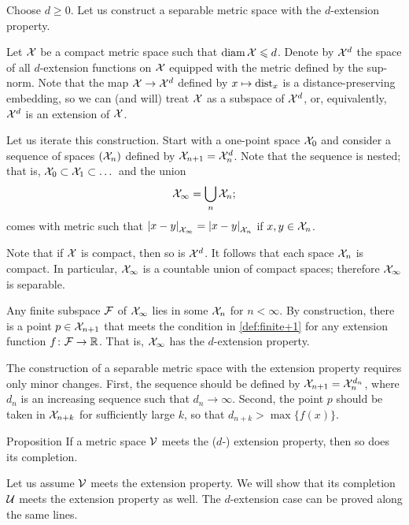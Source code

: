 Choose $d\ge 0$.
Let us construct a separable metric space with  the $d$-extension property.

Let $\mathcal{X}$ be a compact metric space such that $\operatorname{\rm diam}\nolimits\mathcal{X}\leqslant d$.
Denote by $\mathcal{X}^d$ the space of all $d$-extension functions on $\mathcal{X}$ equipped with the metric defined by the sup-norm.
Note that the map $\mathcal{X} \to \mathcal{X}^d$ defined by $x\mapsto\mathrm{dist}_x$ is a distance-preserving embedding,
so we can (and will) treat $\mathcal{X}$ as a subspace of $\mathcal{X}^d$, or, equivalently, $\mathcal{X}^d$ is an extension of $\mathcal{X}$.

Let us iterate this construction.
Start with a one-point space $\mathcal{X}_0$ and consider a sequence of spaces $(\mathcal{X}_n)$ defined by $\spc{X}_{n+1}\z=\spc{X}_n^d$.
Note that the sequence is nested;
that is, $\mathcal{X}_0\subset \mathcal{X}_1\subset\dots$
and the union
\[\mathcal{X}_\infty=\bigcup_n\mathcal{X}_n;\]
comes with metric such that
$\dist{x}{y}{\spc{X}_\infty} = \dist{x}{y}{\spc{X}_n}$
if $x,y\in\mathcal{X}_n$.

Note that if $\mathcal{X}$ is compact, then so is $\mathcal{X}^d$.
It follows that each space $\mathcal{X}_n$ is compact.
In particular, $\mathcal{X}_\infty$ is a countable union of compact spaces;
therefore $\mathcal{X}_\infty$ is separable.

Any finite subspace $\mathcal{F}$ of $\mathcal{X}_\infty$ lies in some $\mathcal{X}_n$ for $n<\infty$.
By construction, there is a point $p\in \mathcal{X}_{n+1}$ that meets the condition in \ref{def:finite+1} for any extension function $f\colon\mathcal{F}\to\mathbb{R}$.
That is, $\mathcal{X}_\infty$ has the $d$-extension property.

The construction of a separable metric space with the extension property requires only minor changes.
First, the sequence should be defined by $\spc{X}_{n+1}\z=\spc{X}_n^{d_n}$, where $d_n$ is an increasing sequence such that $d_n\to\infty$.
Second, the point $p$ should be taken in $\mathcal{X}_{n+k}$ for sufficiently large $k$, so that $d_{n+k}>\max\{f(x)\}$.
\qeds

\begin{thm}{Proposition}\label{prop:completion-univeral}
If a metric space $\mathcal{V}$ meets the ($d$-) extension property, then so does its completion.
\end{thm}

Let us assume $\mathcal{V}$ meets the extension property.
We will show that its completion $\mathcal{U}$ meets the extension property as well.
The $d$-extension case can be proved along the same lines.


